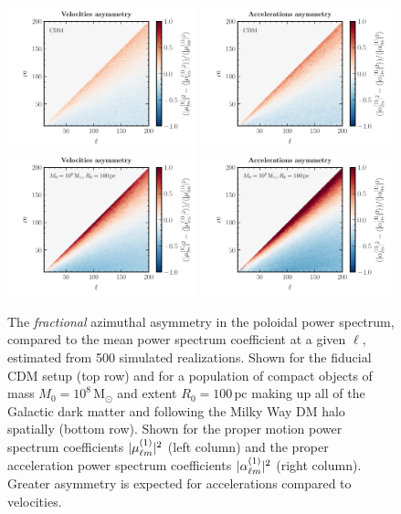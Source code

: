 \documentclass[prd,aps,twocolumn,nofootinbib,superscriptaddress,preprintnumbers,balancelastpage,longbibliography,floatfix]{revtex4-1}
\begin{document}
\begin{figure}[!htbp]
\centering
\includegraphics[width=0.49\textwidth]{plots/m_asymm_1.pdf}
\includegraphics[width=0.49\textwidth]{plots/m_asymm_alpha_1.pdf}
\includegraphics[width=0.49\textwidth]{plots/m_compact_asymm_1.pdf}
\includegraphics[width=0.49\textwidth]{plots/m_compact_asymm_alpha_1.pdf}

\caption{The \emph{fractional} azimuthal asymmetry in the poloidal power spectrum, compared to the mean power spectrum coefficient at a given $\ell$, estimated from 500 simulated realizations. Shown for the fiducial CDM setup (top row) and for a population of compact objects of mass $M_0 = 10^8\,\mathrm{M}_\odot$ and extent $R_0 = 100\,\mathrm{pc}$ making up all of the Galactic dark matter and following the Milky Way DM halo spatially (bottom row). Shown for the proper motion power spectrum coefficients $|\mu_{\ell m}^{(1)}|^2$ (left column) and the proper acceleration power spectrum coefficients $|\alpha_{\ell m}^{(1)}|^2$ (right column). Greater asymmetry is expected for accelerations compared to velocities. }
\label{fig:m_asymm}
\end{figure}
\end{document}
